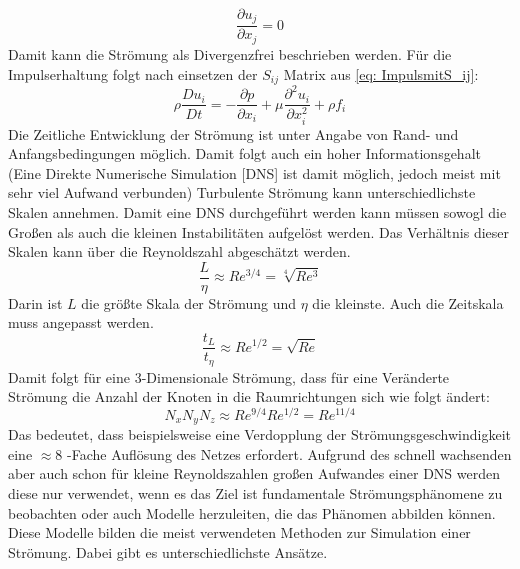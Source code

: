 \begin{equation}
	\label{eq: Massenerhaltung}
	\frac{\partial u_{j}}{\partial x_{j}}=0
\end{equation}
Damit kann die Strömung als Divergenzfrei beschrieben werden. Für die Impulserhaltung folgt nach einsetzen der $S_{ij}$ Matrix aus \ref{eq: ImpulsmitS_ij}: 
\begin{equation}
	\label{eq: Impulserhaltung}
	\rho \frac{Du_i}{Dt} = -\frac{\partial p}{\partial x_i}+\mu \frac{\partial^2 u_i}{\partial x^{2}_{i}} + \rho f_i
\end{equation}
Die Zeitliche Entwicklung der Strömung ist unter Angabe von Rand- und Anfangsbedingungen möglich. Damit folgt auch ein hoher Informationsgehalt (Eine Direkte Numerische Simulation [DNS] ist damit möglich, jedoch meist mit sehr viel Aufwand verbunden) 
Turbulente Strömung kann unterschiedlichste Skalen annehmen. Damit eine DNS durchgeführt werden kann müssen sowogl die Großen als auch die kleinen Instabilitäten aufgelöst werden. Das Verhältnis dieser Skalen kann über die Reynoldszahl abgeschätzt werden. 
\begin{equation}
	\frac{L}{\eta} \approx Re^{3/4} = \sqrt[4]{Re^3}
\end{equation}
Darin ist $L$ die größte Skala der Strömung und $\eta$ die kleinste. Auch die Zeitskala muss angepasst werden.
\begin{equation}
	\frac{t_L}{t_{\eta}} \approx Re^{1/2} = \sqrt{Re}
\end{equation}
Damit folgt für eine 3-Dimensionale Strömung, dass für eine Veränderte Strömung die Anzahl der Knoten in die Raumrichtungen sich wie folgt ändert:
\begin{equation}
	N_xN_yN_z \approx Re^{9/4}Re^{1/2} = Re^{11/4}
\end{equation}
Das bedeutet, dass beispielsweise eine Verdopplung der Strömungsgeschwindigkeit eine $\approx$8 -Fache Auflösung des Netzes erfordert. Aufgrund des schnell wachsenden aber auch schon für kleine Reynoldszahlen großen Aufwandes einer DNS werden diese nur verwendet, wenn es das Ziel ist fundamentale Strömungsphänomene zu beobachten oder auch Modelle herzuleiten, die das Phänomen abbilden können. Diese Modelle bilden die meist verwendeten Methoden zur Simulation einer Strömung. Dabei gibt es unterschiedlichste Ansätze. 


